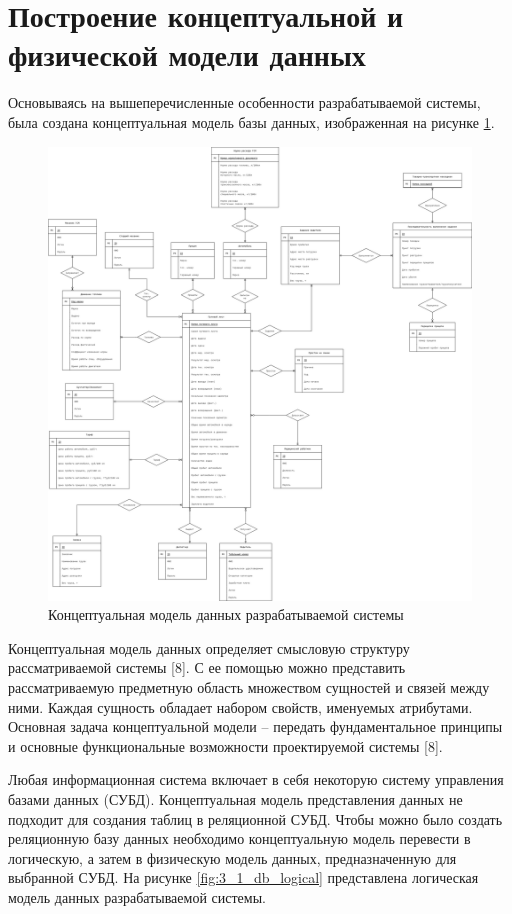 \documentclass[../nirs.tex]{subfiles}
\begin{document}
\section{Построение концептуальной и физической модели данных}
Основываясь на вышеперечисленные особенности разрабатываемой системы, была
создана концептуальная модель базы данных, изображенная на рисунке
\ref{fig:3_1_db_conceptual}.

\begin{figure}[H]
	\centering
	\includegraphics[keepaspectratio,width=\textwidth]{../2/images/2_1_3_er-diagram.png}
	\caption{Концептуальная модель данных разрабатываемой системы}
	\label{fig:3_1_db_conceptual}
\end{figure}

Концептуальная модель данных определяет смысловую структуру рассматриваемой
системы [8]. С ее помощью можно представить рассматриваемую предметную область
множеством сущностей и связей между ними. Каждая сущность обладает набором
свойств, именуемых атрибутами. Основная задача концептуальной модели -- передать
фундаментальное принципы и основные функциональные возможности проектируемой
системы [8].

Любая информационная система включает в себя некоторую систему управления базами
данных (СУБД). Концептуальная модель представления данных не подходит для
создания таблиц в реляционной СУБД. Чтобы можно было создать реляционную базу
данных необходимо концептуальную модель перевести в логическую, а затем в
физическую  модель данных, предназначенную для выбранной СУБД. На рисунке
\ref{fig:3_1_db_logical} представлена логическая модель данных разрабатываемой
системы.
\end{document}
